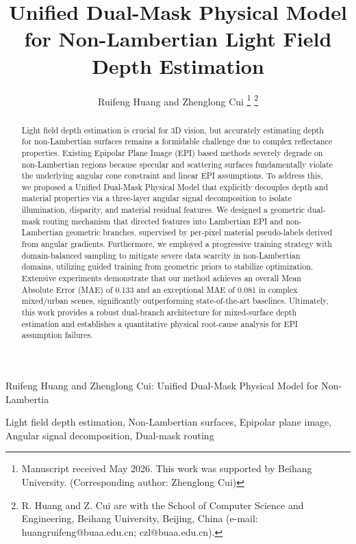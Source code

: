 \documentclass[lettersize,journal]{IEEEtran}
\begin{document}
\title{Unified Dual-Mask Physical Model for Non-Lambertian Light Field Depth Estimation}

\author{Ruifeng Huang and Zhenglong Cui
\thanks{Manuscript received May 2026. This work was supported by Beihang University. (Corresponding author: Zhenglong Cui)}
\thanks{R. Huang and Z. Cui are with the School of Computer Science and Engineering, Beihang University, Beijing, China (e-mail: huangruifeng@buaa.edu.cn; czl@buaa.edu.cn).}}

%
{Ruifeng Huang and Zhenglong Cui: Unified Dual-Mask Physical Model for Non-Lambertia}

\maketitle

\begin{abstract}
Light field depth estimation is crucial for 3D vision, but accurately estimating depth for non-Lambertian surfaces remains a formidable challenge due to complex reflectance properties. Existing Epipolar Plane Image (EPI) based methods severely degrade on non-Lambertian regions because specular and scattering surfaces fundamentally violate the underlying angular cone constraint and linear EPI assumptions. To address this, we proposed a Unified Dual-Mask Physical Model that explicitly decouples depth and material properties via a three-layer angular signal decomposition to isolate illumination, disparity, and material residual features. We designed a geometric dual-mask routing mechanism that directed features into Lambertian EPI and non-Lambertian geometric branches, supervised by per-pixel material pseudo-labels derived from angular gradients. Furthermore, we employed a progressive training strategy with domain-balanced sampling to mitigate severe data scarcity in non-Lambertian domains, utilizing guided training from geometric priors to stabilize optimization. Extensive experiments demonstrate that our method achieves an overall Mean Absolute Error (MAE) of 0.133 and an exceptional MAE of 0.081 in complex mixed/urban scenes, significantly outperforming state-of-the-art baselines. Ultimately, this work provides a robust dual-branch architecture for mixed-surface depth estimation and establishes a quantitative physical root-cause analysis for EPI assumption failures.
\end{abstract}

\begin{IEEEkeywords}
Light field depth estimation, Non-Lambertian surfaces, Epipolar plane image, Angular signal decomposition, Dual-mask routing
\end{IEEEkeywords}
\end{document}

